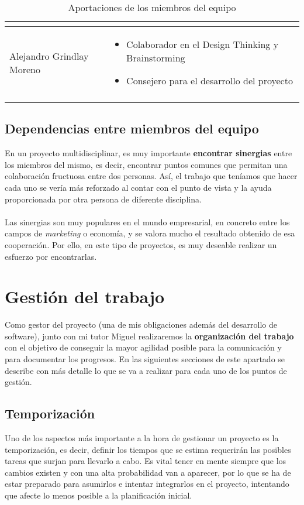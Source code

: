 \begin{longtable}{|m{4.5cm}|m{6.5cm}|}
\begin{itemize}
        \end{itemize} \\
    \hline
        Alejandro Grindlay Moreno & \begin{itemize}
            \item Colaborador en el Design Thinking y Brainstorming
            \item Consejero para el desarrollo del proyecto
        \end{itemize} \\
    \hline
    \caption{Aportaciones de los miembros del equipo}
    \label{tareassmartu}
\end{longtable}

\subsection{Dependencias entre miembros del equipo}
En un proyecto multidisciplinar, es muy importante \textbf{encontrar sinergias} entre los miembros del mismo, es decir, encontrar puntos comunes que permitan una colaboración fructuosa entre dos personas. Así, el trabajo que teníamos que hacer cada uno se vería más reforzado al contar con el punto de vista y la ayuda proporcionada por otra persona de diferente disciplina.\\\\

Las sinergias son muy populares en el mundo empresarial, en concreto entre los campos de \textit{marketing} o economía, y se valora mucho el resultado obtenido de esa cooperación. Por ello, en este tipo de proyectos, es muy deseable realizar un esfuerzo por encontrarlas.

\section{Gestión del trabajo}
Como gestor del proyecto (una de mis obligaciones además del desarrollo de software), junto con mi tutor Miguel realizaremos la \textbf{organización del trabajo} con el objetivo de conseguir la mayor agilidad posible para la comunicación y para documentar los progresos. En las siguientes secciones de este apartado se describe con más detalle lo que se va a realizar para cada uno de los puntos de gestión.

\subsection{Temporización}
Uno de los aspectos más importante a la hora de gestionar un proyecto es la temporización, es decir, definir los tiempos que se estima requerirán las posibles tareas que surjan para llevarlo a cabo. Es vital tener en mente siempre que los cambios existen y con una alta probabilidad van a aparecer, por lo que se ha de estar preparado para asumirlos e intentar integrarlos en el proyecto, intentando que afecte lo menos posible a la planificación inicial.\\

